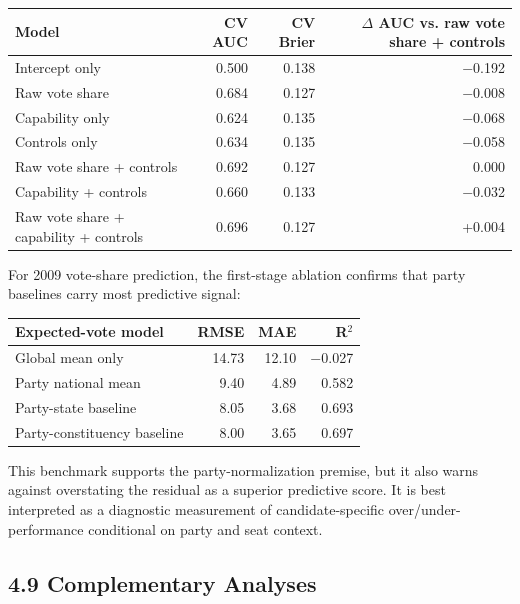 \documentclass[
]{article}
\newcounter{none} %
\begin{document}
{\def\LTcaptype{none} %
\begin{longtable}[]{@{}lrrr@{}}
\toprule\noalign{}
Model & CV AUC & CV Brier & $\Delta$ AUC vs. raw vote share + controls \\
\midrule\noalign{}
\endhead
\bottomrule\noalign{}
\endlastfoot
Intercept only & 0.500 & 0.138 & $-$0.192 \\
Raw vote share & 0.684 & 0.127 & $-$0.008 \\
Capability only & 0.624 & 0.135 & $-$0.068 \\
Controls only & 0.634 & 0.135 & $-$0.058 \\
Raw vote share + controls & 0.692 & 0.127 & 0.000 \\
Capability + controls & 0.660 & 0.133 & $-$0.032 \\
Raw vote share + capability + controls & 0.696 & 0.127 & +0.004 \\
\end{longtable}
}

For 2009 vote-share prediction, the first-stage ablation confirms that party baselines carry most predictive signal:

{\def\LTcaptype{none} %
\begin{longtable}[]{@{}lrrr@{}}
\toprule\noalign{}
Expected-vote model & RMSE & MAE & R$^2$ \\
\midrule\noalign{}
\endhead
\bottomrule\noalign{}
\endlastfoot
Global mean only & 14.73 & 12.10 & $-$0.027 \\
Party national mean & 9.40 & 4.89 & 0.582 \\
Party-state baseline & 8.05 & 3.68 & 0.693 \\
Party-constituency baseline & 8.00 & 3.65 & 0.697 \\
\end{longtable}
}

This benchmark supports the party-normalization premise, but it also warns against overstating the residual as a superior predictive score. It is best interpreted as a diagnostic measurement of candidate-specific over/under-performance conditional on party and seat context.

\subsection{4.9 Complementary Analyses}\label{49-complementary-analyses}
\end{document}
